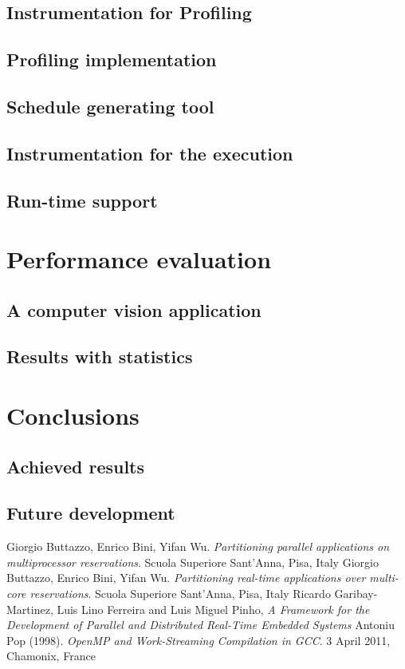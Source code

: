 \documentclass[a4paper,11pt,oneside]{book}
\begin{document}
\section{Instrumentation for Profiling}
\section{Profiling implementation}
\section{Schedule generating tool}
\section{Instrumentation for the execution}
\section{Run-time support}

\chapter{Performance evaluation}
\section{A computer vision application}
\section{Results with statistics}

\chapter{Conclusions}
\section{Achieved results}
\section{Future development}






\begin{thebibliography}{9}
 Giorgio Buttazzo, Enrico Bini, Yifan Wu. \emph{Partitioning parallel applications on multiprocessor reservations}. Scuola Superiore Sant’Anna, Pisa, Italy
 Giorgio Buttazzo, Enrico Bini, Yifan Wu. \emph{Partitioning real-time applications over multi-core reservations}. Scuola Superiore Sant’Anna, Pisa, Italy
 Ricardo Garibay-Martinez, Luis Lino Ferreira and Luis Miguel Pinho, \emph{A Framework for the Development of Parallel and Distributed Real-Time Embedded Systems}
Antoniu Pop (1998). \emph{OpenMP and Work-Streaming Compilation in GCC}. 3 April 2011, Chamonix, France

\end{thebibliography}
\end{document}
